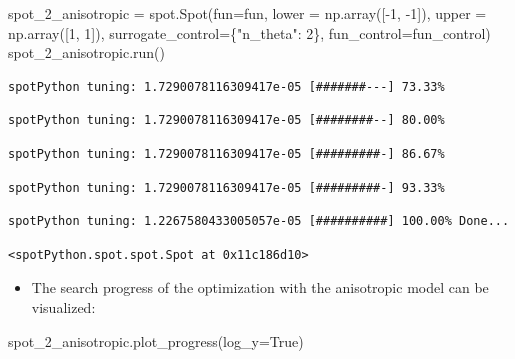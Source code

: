 \documentclass[
  letterpaper,
  DIV=11,
  numbers=noendperiod]{scrreprt}
\newenvironment{Shaded}{\begin{snugshade}}{\end{snugshade}}
\newcommand{\DecValTok}[1]{\textcolor[rgb]{0.68,0.00,0.00}{#1}}
\newcommand{\NormalTok}[1]{\textcolor[rgb]{0.00,0.23,0.31}{#1}}
\newcommand{\OperatorTok}[1]{\textcolor[rgb]{0.37,0.37,0.37}{#1}}
\newcommand{\StringTok}[1]{\textcolor[rgb]{0.13,0.47,0.30}{#1}}
\newcommand{\VariableTok}[1]{\textcolor[rgb]{0.07,0.07,0.07}{#1}}
\providecommand{\tightlist}{%
  \setlength{\itemsep}{0pt}\setlength{\parskip}{0pt}}\usepackage{longtable,booktabs,array}
\begin{document}
\begin{Shaded}
\begin{Highlighting}[]
\NormalTok{spot\_2\_anisotropic }\OperatorTok{=}\NormalTok{ spot.Spot(fun}\OperatorTok{=}\NormalTok{fun,}
\NormalTok{                   lower }\OperatorTok{=}\NormalTok{ np.array([}\OperatorTok{{-}}\DecValTok{1}\NormalTok{, }\OperatorTok{{-}}\DecValTok{1}\NormalTok{]),}
\NormalTok{                   upper }\OperatorTok{=}\NormalTok{ np.array([}\DecValTok{1}\NormalTok{, }\DecValTok{1}\NormalTok{]),}
\NormalTok{                   surrogate\_control}\OperatorTok{=}\NormalTok{\{}\StringTok{"n\_theta"}\NormalTok{: }\DecValTok{2}\NormalTok{\},}
\NormalTok{                   fun\_control}\OperatorTok{=}\NormalTok{fun\_control)}
\NormalTok{spot\_2\_anisotropic.run()}
\end{Highlighting}
\end{Shaded}

\begin{verbatim}
spotPython tuning: 1.7290078116309417e-05 [#######---] 73.33% 
\end{verbatim}

\begin{verbatim}
spotPython tuning: 1.7290078116309417e-05 [########--] 80.00% 
\end{verbatim}

\begin{verbatim}
spotPython tuning: 1.7290078116309417e-05 [#########-] 86.67% 
\end{verbatim}

\begin{verbatim}
spotPython tuning: 1.7290078116309417e-05 [#########-] 93.33% 
\end{verbatim}

\begin{verbatim}
spotPython tuning: 1.2267580433005057e-05 [##########] 100.00% Done...
\end{verbatim}

\begin{verbatim}
<spotPython.spot.spot.Spot at 0x11c186d10>
\end{verbatim}

\begin{itemize}
\tightlist
\item
  The search progress of the optimization with the anisotropic model can
  be visualized:
\end{itemize}

\begin{Shaded}
\begin{Highlighting}[]
\NormalTok{spot\_2\_anisotropic.plot\_progress(log\_y}\OperatorTok{=}\VariableTok{True}\NormalTok{)}
\end{Highlighting}
\end{Shaded}
\end{document}
